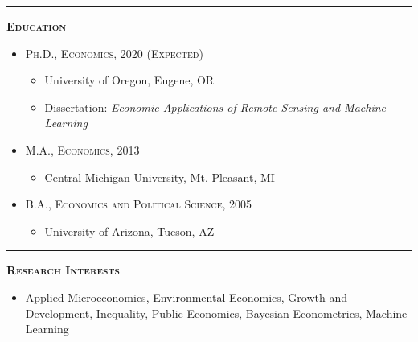 \documentclass[12pt]{article}
\begin{document}
\bigskip 




\hrule
\bigskip 
\noindent \textsc{\large \textbf{Education}}

\begin{itemize}
\item[] \textsc{Ph.D., Economics, 2020 (Expected)}
\begin{itemize}[topsep=-1em, noitemsep]
\item[] University of Oregon, Eugene, OR
\item[] Dissertation: \textit{Economic Applications of Remote Sensing and Machine Learning}
\end{itemize}
\end{itemize}

\begin{itemize}
\item[] \textsc{M.A., Economics, 2013}
\begin{itemize}[topsep=-1em, noitemsep]
\item[] Central Michigan University, Mt. Pleasant, MI
\end{itemize}
\end{itemize}

\begin{itemize}
\item[] \textsc{B.A., Economics and Political Science, 2005}
\begin{itemize}[topsep=-1em, noitemsep]
\item[] University of Arizona, Tucson, AZ
\end{itemize}
\end{itemize}

\hrule
\bigskip 
\noindent \textsc{\large \textbf{Research Interests}}

\begin{itemize}
\item[] Applied Microeconomics,  Environmental Economics, Growth and Development, Inequality, Public Economics, Bayesian Econometrics, Machine Learning
\end{itemize}
\end{document}
